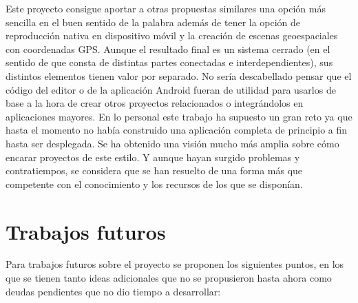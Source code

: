 Este proyecto consigue aportar a otras propuestas similares una opción más sencilla en el buen sentido de la palabra además de tener la opción de reproducción nativa en dispositivo móvil y la creación de escenas geoespaciales con coordenadas GPS. Aunque el resultado final es un sistema cerrado (en el sentido de que consta de distintas partes conectadas e interdependientes), sus distintos elementos tienen valor por separado. No sería descabellado pensar que el código del editor o de la aplicación Android fueran de utilidad para usarlos de base a la hora de crear otros proyectos relacionados o integrándolos en aplicaciones mayores. En lo personal este trabajo ha supuesto un gran reto ya que hasta el momento no había construido una aplicación completa de principio a fin hasta ser desplegada. Se ha obtenido una visión mucho más amplia sobre cómo encarar proyectos de este estilo. Y aunque hayan surgido problemas y contratiempos, se considera que se han resuelto de una forma más que competente con el conocimiento y los recursos de los que se disponían.

\section{Trabajos futuros}

Para trabajos futuros sobre el proyecto se proponen los siguientes puntos, en los que se tienen tanto ideas adicionales que no se propusieron hasta ahora como deudas pendientes que no dio tiempo a desarrollar:

